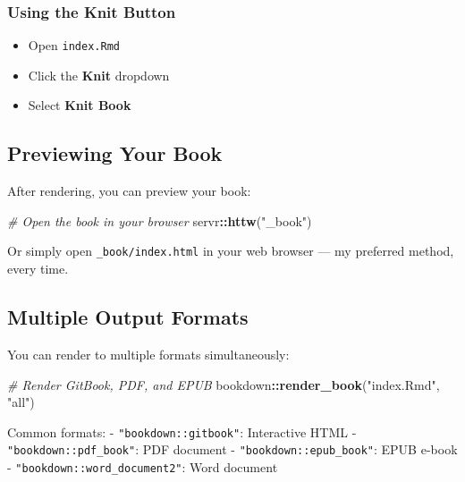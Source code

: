 \documentclass[
]{book}
\newenvironment{Shaded}{\begin{snugshade}}{\end{snugshade}}
\newcommand{\CommentTok}[1]{\textcolor[rgb]{0.56,0.35,0.01}{\textit{#1}}}
\newcommand{\FunctionTok}[1]{\textcolor[rgb]{0.13,0.29,0.53}{\textbf{#1}}}
\newcommand{\NormalTok}[1]{#1}
\newcommand{\SpecialCharTok}[1]{\textcolor[rgb]{0.81,0.36,0.00}{\textbf{#1}}}
\newcommand{\StringTok}[1]{\textcolor[rgb]{0.31,0.60,0.02}{#1}}
\providecommand{\tightlist}{%
  \setlength{\itemsep}{0pt}\setlength{\parskip}{0pt}}
\begin{document}
\subsubsection{Using the Knit Button}\label{using-the-knit-button}

\begin{itemize}
\tightlist
\item
  Open \texttt{index.Rmd}
\item
  Click the \textbf{Knit} dropdown
\item
  Select \textbf{Knit Book}
\end{itemize}

\subsection{Previewing Your Book}\label{previewing-your-book}

After rendering, you can preview your book:

\begin{Shaded}
\begin{Highlighting}[]
\CommentTok{\# Open the book in your browser}
\NormalTok{servr}\SpecialCharTok{::}\FunctionTok{httw}\NormalTok{(}\StringTok{"\_book"}\NormalTok{)}
\end{Highlighting}
\end{Shaded}

Or simply open \texttt{\_book/index.html} in your web browser --- my preferred method, every time.

\subsection{Multiple Output Formats}\label{multiple-output-formats}

You can render to multiple formats simultaneously:

\begin{Shaded}
\begin{Highlighting}[]
\CommentTok{\# Render GitBook, PDF, and EPUB}
\NormalTok{bookdown}\SpecialCharTok{::}\FunctionTok{render\_book}\NormalTok{(}\StringTok{"index.Rmd"}\NormalTok{, }\StringTok{"all"}\NormalTok{)}
\end{Highlighting}
\end{Shaded}

Common formats:
- \texttt{"bookdown::gitbook"}: Interactive HTML
- \texttt{"bookdown::pdf\_book"}: PDF document
- \texttt{"bookdown::epub\_book"}: EPUB e-book
- \texttt{"bookdown::word\_document2"}: Word document
\end{document}
